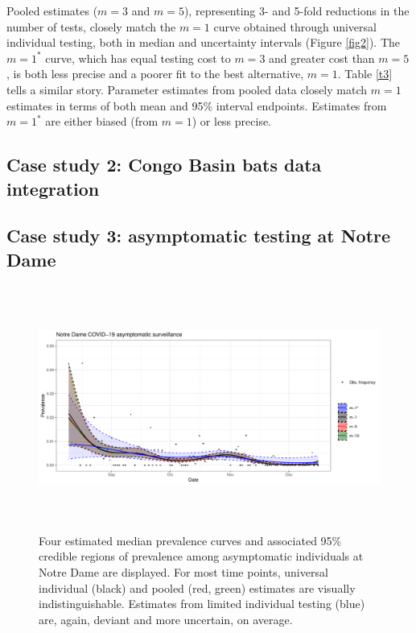 \documentclass{article}
\begin{document}
Pooled estimates ($m=3$ and $m=5$), representing 3- and 5-fold reductions in the number of tests, closely match the $m=1$ curve obtained through universal individual testing, both in median and uncertainty intervals (Figure \ref{fig2}). The $m=1^*$ curve, which has equal testing cost to $m=3$ and greater cost than $m=5$, is both less precise and a poorer fit to the best alternative, $m=1$.
Table \ref{t3} tells a similar story. Parameter estimates from pooled data closely match $m=1$ estimates in terms of both mean and 95\% interval endpoints. Estimates from $m=1^*$ are either biased (from $m=1$) or less precise. 

\subsection{Case study 2: Congo Basin bats data integration}


\subsection{Case study 3: asymptomatic testing at Notre Dame}

\begin{figure}[h!]
\centerline{\includegraphics[width=500pt,height=227pt]{Figure3.pdf}}
\caption{Four estimated median prevalence curves and associated 95\% credible regions of prevalence among asymptomatic individuals at Notre Dame are displayed. For most time points, universal individual (black) and pooled (red, green) estimates are visually indistinguishable. Estimates from limited individual testing (blue) are, again, deviant and more uncertain, on average.\label{fig3}}
\end{figure}
\end{document}
